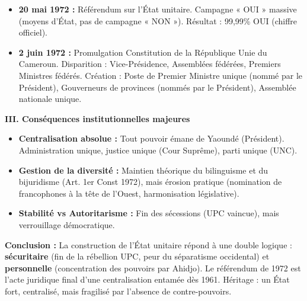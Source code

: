 \documentclass[11pt]{article}
\begin{document}
\begin{exoresolu}
\begin{itemize}
    \item \textbf{20 mai 1972 :} Référendum sur l'État unitaire. Campagne « OUI » massive (moyens d'État, pas de campagne « NON »). Résultat : 99,99\% OUI (chiffre officiel).
    \item \textbf{2 juin 1972 :} Promulgation Constitution de la République Unie du Cameroun. Disparition : Vice-Présidence, Assemblées fédérées, Premiers Ministres fédérés. Création : Poste de Premier Ministre unique (nommé par le Président), Gouverneurs de provinces (nommés par le Président), Assemblée nationale unique.
\end{itemize}
\textbf{III. Conséquences institutionnelles majeures}
\begin{itemize}
    \item \textbf{Centralisation absolue :} Tout pouvoir émane de Yaoundé (Président). Administration unique, justice unique (Cour Suprême), parti unique (UNC).
    \item \textbf{Gestion de la diversité :} Maintien théorique du bilinguisme et du bijuridisme (Art. 1er Const 1972), mais érosion pratique (nomination de francophones à la tête de l'Ouest, harmonisation législative).
    \item \textbf{Stabilité vs Autoritarisme :} Fin des sécessions (UPC vaincue), mais verrouillage démocratique.
\end{itemize}
\textbf{Conclusion :} La construction de l'État unitaire répond à une double logique : \textbf{sécuritaire} (fin de la rébellion UPC, peur du séparatisme occidental) et \textbf{personnelle} (concentration des pouvoirs par Ahidjo). Le référendum de 1972 est l'acte juridique final d'une centralisation entamée dès 1961. Héritage : un État fort, centralisé, mais fragilisé par l'absence de contre-pouvoirs.
\end{exoresolu}
\end{document}
